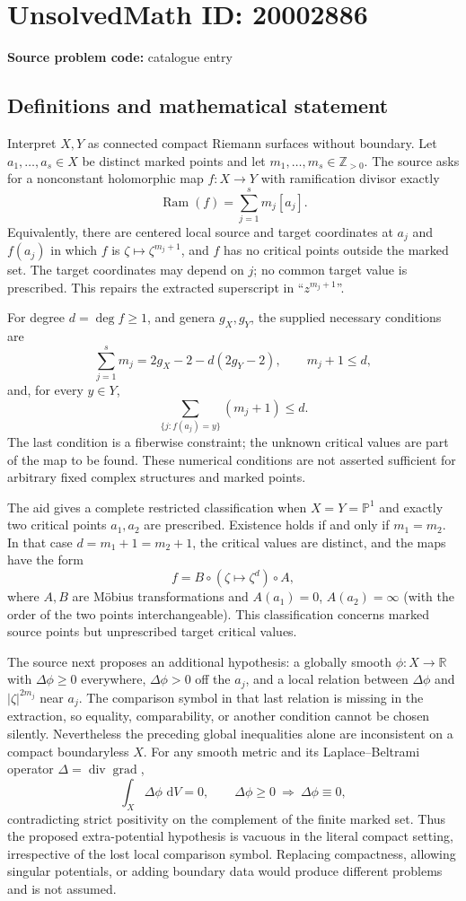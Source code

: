 \documentclass[11pt]{article}
\newcommand{\Z}{\mathbb{Z}}
\newcommand{\R}{\mathbb{R}}
\newcommand{\PP}{\mathbb{P}}
\newcommand{\dd}{\,\mathrm{d}}
\begin{document}
\section*{UnsolvedMath ID: 20002886}
\textbf{Source problem code:} catalogue entry
\subsection{Definitions and mathematical statement}
Interpret $X,Y$ as connected compact Riemann surfaces without boundary. Let $a_1,\ldots,a_s\in X$ be distinct marked points and let $m_1,\ldots,m_s\in\Z_{>0}$. The source asks for a nonconstant holomorphic map $f:X\to Y$ with ramification divisor exactly
\[
\operatorname{Ram}(f)=\sum_{j=1}^s m_j[a_j].
\]
Equivalently, there are centered local source and target coordinates at $a_j$ and $f(a_j)$ in which $f$ is $\zeta\mapsto\zeta^{m_j+1}$, and $f$ has no critical points outside the marked set. The target coordinates may depend on $j$; no common target value is prescribed. This repairs the extracted superscript in ``$z^{m_j+1}$''.

For degree $d=\deg f\geq1$, and genera $g_X,g_Y$, the supplied necessary conditions are
\[
\sum_{j=1}^s m_j=2g_X-2-d(2g_Y-2),\qquad m_j+1\leq d,
\]
and, for every $y\in Y$,
\[
\sum_{\{j:f(a_j)=y\}}(m_j+1)\leq d.
\]
The last condition is a fiberwise constraint; the unknown critical values are part of the map to be found. These numerical conditions are not asserted sufficient for arbitrary fixed complex structures and marked points.

The aid gives a complete restricted classification when $X=Y=\PP^1$ and exactly two critical points $a_1,a_2$ are prescribed. Existence holds if and only if $m_1=m_2$. In that case $d=m_1+1=m_2+1$, the critical values are distinct, and the maps have the form
\[
f=B\circ(\zeta\mapsto\zeta^d)\circ A,
\]
where $A,B$ are M\"obius transformations and $A(a_1)=0$, $A(a_2)=\infty$ (with the order of the two points interchangeable). This classification concerns marked source points but unprescribed target critical values.

The source next proposes an additional hypothesis: a globally smooth $\phi:X\to\R$ with $\Delta\phi\geq0$ everywhere, $\Delta\phi>0$ off the $a_j$, and a local relation between $\Delta\phi$ and $|\zeta|^{2m_j}$ near $a_j$. The comparison symbol in that last relation is missing in the extraction, so equality, comparability, or another condition cannot be chosen silently. Nevertheless the preceding global inequalities alone are inconsistent on a compact boundaryless $X$. For any smooth metric and its Laplace--Beltrami operator $\Delta=\operatorname{div}\operatorname{grad}$,
\[
\int_X\Delta\phi\,\dd V=0,
\qquad \Delta\phi\geq0\ \Longrightarrow\ \Delta\phi\equiv0,
\]
contradicting strict positivity on the complement of the finite marked set. Thus the proposed extra-potential hypothesis is vacuous in the literal compact setting, irrespective of the lost local comparison symbol. Replacing compactness, allowing singular potentials, or adding boundary data would produce different problems and is not assumed.
\end{document}
